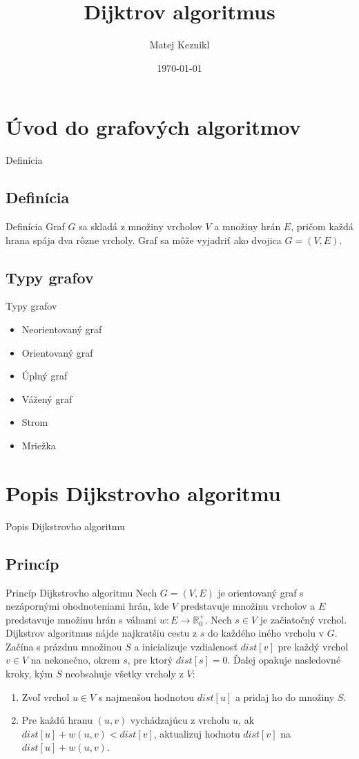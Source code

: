 \documentclass[15pt]{beamer}
\title[Dijktrov algoritmus]{Dijktrov algoritmus}
\author{Matej Keznikl}
\institute[VUT FIT]{Fakulta informačních technologií\\Vysoké učení technické v~Brně}
\date{\today}
\begin{document}
\frame{\titlepage}

\section{Úvod do grafových algoritmov}
\begin{frame}{Definícia}
	\subsection{Definícia}
	\begin{block}{Definícia}
		Graf $G$ sa skladá z množiny vrcholov $V$ a množiny hrán $E$, pričom každá hrana spája dva rôzne vrcholy. Graf sa môže vyjadriť ako dvojica $G = (V,E)$.
	\end{block}
	\subsection{Typy grafov}
	\begin{block}{Typy grafov}
		\begin{itemize}
			\item Neorientovaný graf
			\item Orientovaný graf
			\item Úplný graf
			\item Vážený graf
			\item Strom
			\item Mriežka
		\end{itemize}
	\end{block}
\end{frame}

\section{Popis Dijkstrovho algoritmu}
\begin{frame}{Popis Dijkstrovho algoritmu}
	\subsection{Princíp}
	\begin{block}{Princíp Dijkstrovho algoritmu}
		Nech $G=(V,E)$ je orientovaný graf s nezápornými ohodnoteniami hrán, kde $V$ predstavuje množinu vrcholov a $E$ predstavuje množinu hrán s váhami $w: E \rightarrow \mathbb{R}^+_0$. Nech $s \in V$ je začiatočný vrchol. Dijkstrov algoritmus nájde najkratšiu cestu z $s$ do každého iného vrcholu v $G$. Začína s prázdnu množinou $S$ a inicializuje vzdialenosť $dist[v]$ pre každý vrchol $v \in V$ na nekonečno, okrem $s$, pre ktorý $dist[s]=0$. Ďalej opakuje nasledovné kroky, kým $S$ neobsahuje všetky vrcholy z $V$:
		\begin{enumerate}
			\item Zvoľ vrchol $u \in V$ s najmenšou hodnotou $dist[u]$ a pridaj ho do množiny $S$.
			\item Pre každú hranu $(u,v)$ vychádzajúcu z vrcholu $u$, ak $dist[u] + w(u,v) < dist[v]$, aktualizuj hodnotu $dist[v]$ na $dist[u] + w(u,v)$.
			      			      			      
		\end{enumerate}
	\end{block}
\end{frame}
\end{document}
